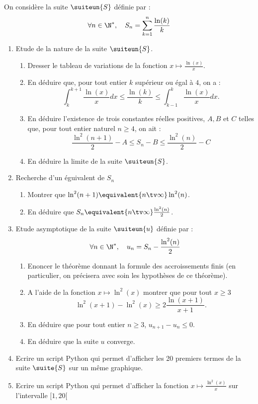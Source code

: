 



\begin{probleme}
On considère la suite $\suiteun{S}$ définie par :
$$\forall n\in \N^*, \quad S_n  =\sum_{k=1}^n \frac{\ln(k)}{k}$$

\begin{enumerate}
\item Etude de la nature de la suite $\suiteun{S}$.
\begin{enumerate}
\item Dresser le tableau  de variations de la fonction $x\mapsto \frac{\ln(x)}{x}$.
\item En déduire que, pour tout entier $k$ supérieur ou égal à $4$, on a : 
$$\int_k^{k+1} \frac{\ln(x)}{x}dx\leq \frac{\ln(k)}{k} \leq \int_{k-1}^{k} \frac{\ln(x)}{x}dx.$$
\item En déduire l'existence de trois constantes réelles positives, $A,B $ et $C$ telles que, pour tout entier naturel $n\geq 4$, on ait : 
$$\frac{\ln^2(n+1)}{2} -A\leq S_n-B \leq \frac{\ln^2(n)}{2} -C$$
\item En déduire la limite de la suite $\suiteun{S}$. 
\end{enumerate}
\item Recherche d'un éguivalent de $S_n$
\begin{enumerate}
\item Montrer que $\ln^2(n+1) \equivalent{n\tv \infty} \ln^2(n)$.
\item En déduire que $S_n\equivalent{n\tv \infty} \frac{\ln^2(n)}{2}$.
\end{enumerate}
\item Etude asymptotique de la suite $\suiteun{u}$ définie par : 
$$\forall n\in \N^*, \quad u_n=S_n -\frac{\ln^2(n)}{2}$$
\begin{enumerate}
\item Enoncer le théorème donnant la formule des accroissements finis (en particulier, on précisera avec soin les hypothèses de ce théorème).
\item A l'aide de la fonction $x \mapsto \ln^2(x) $   montrer que  pour tout $x\geq 3$
$$\ln^2(x+1) -\ln^2(x) \geq 2\frac{\ln(x+1)}{x+1}.$$
\item En déduire  que pour tout entier $n\geq 3$, $u_{n+1} -u_n \leq 0$.
\item En déduire que la suite $u$ converge. 
\end{enumerate}
\item Ecrire un script Python qui permet d'afficher les 20 premiers termes de la suite $\suite{S}$ sur un même graphique. 
\item Ecrire  un script Python qui permet d'afficher la fonction $x\mapsto \frac{\ln^2(x)}{x}$ sur l'intervalle $[1,20[$


\end{enumerate}
\end{probleme}
